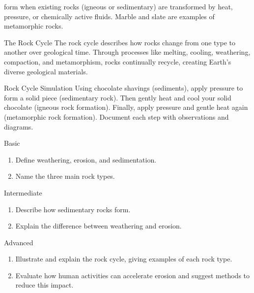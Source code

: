  form when existing rocks (igneous or sedimentary) are transformed by heat, pressure, or chemically active fluids. Marble and slate are examples of metamorphic rocks.

\begin{keyconcept}{The Rock Cycle}
The rock cycle describes how rocks change from one type to another over geological time. Through processes like melting, cooling, weathering, compaction, and metamorphism, rocks continually recycle, creating Earth's diverse geological materials.
\end{keyconcept}


\begin{investigation}{Rock Cycle Simulation}
Using chocolate shavings (sediments), apply pressure to form a solid piece (sedimentary rock). Then gently heat and cool your solid chocolate (igneous rock formation). Finally, apply pressure and gentle heat again (metamorphic rock formation). Document each step with observations and diagrams.
\end{investigation}

\begin{tieredquestions}{Basic}
\begin{enumerate}
\item Define weathering, erosion, and sedimentation.
\item Name the three main rock types.
\end{enumerate}
\end{tieredquestions}

\begin{tieredquestions}{Intermediate}
\begin{enumerate}
\item Describe how sedimentary rocks form.
\item Explain the difference between weathering and erosion.
\end{enumerate}
\end{tieredquestions}

\begin{tieredquestions}{Advanced}
\begin{enumerate}
\item Illustrate and explain the rock cycle, giving examples of each rock type.
\item Evaluate how human activities can accelerate erosion and suggest methods to reduce this impact.
\end{enumerate}
\end{tieredquestions}

